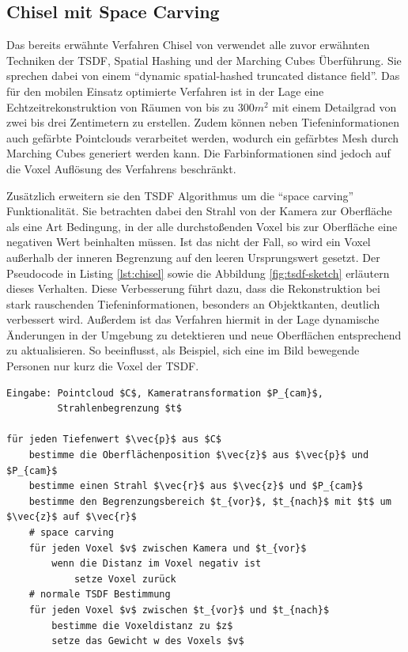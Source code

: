 \subsection{Chisel mit Space Carving} \label{sec:chisel}

Das bereits erwähnte Verfahren Chisel von \citet{Klingensmith_2015_7924} verwendet alle zuvor erwähnten Techniken der TSDF, Spatial Hashing und der Marching Cubes Überführung. Sie sprechen dabei von einem \enquote{dynamic spatial-hashed truncated distance field}. Das für den mobilen Einsatz optimierte Verfahren ist in der Lage eine Echtzeitrekonstruktion von Räumen von bis zu \(300 m^2\) mit einem Detailgrad von zwei bis drei Zentimetern zu erstellen. Zudem können neben Tiefeninformationen auch gefärbte Pointclouds verarbeitet werden, wodurch ein gefärbtes Mesh durch Marching Cubes generiert werden kann. Die Farbinformationen sind jedoch auf die Voxel Auflösung des Verfahrens beschränkt. \citep{Klingensmith_2015_7924}

Zusätzlich erweitern sie den TSDF Algorithmus um die \enquote{space carving} Funktionalität. Sie betrachten dabei den Strahl von der Kamera zur Oberfläche als eine Art Bedingung, in der alle durchstoßenden Voxel bis zur Oberfläche eine negativen Wert beinhalten müssen. Ist das nicht der Fall, so wird ein Voxel außerhalb der inneren Begrenzung auf den leeren Ursprungswert gesetzt. Der Pseudocode in Listing \ref{lst:chisel} sowie die Abbildung \ref{fig:tsdf-sketch} erläutern dieses Verhalten. Diese Verbesserung führt dazu, dass die Rekonstruktion bei stark rauschenden Tiefeninformationen, besonders an Objektkanten, deutlich verbessert wird. Außerdem ist das Verfahren hiermit in der Lage dynamische Änderungen in der Umgebung zu detektieren und neue Oberflächen entsprechend zu aktualisieren. So beeinflusst, als Beispiel, sich eine im Bild bewegende Personen nur kurz die Voxel der TSDF. \citep{Klingensmith_2015_7924}


\begin{lstlisting}[mathescape,caption=Chisel TSDF Algorithmus, label=lst:chisel, float=htbp]
Eingabe: Pointcloud $C$, Kameratransformation $P_{cam}$, 
         Strahlenbegrenzung $t$

für jeden Tiefenwert $\vec{p}$ aus $C$
    bestimme die Oberflächenposition $\vec{z}$ aus $\vec{p}$ und $P_{cam}$
    bestimme einen Strahl $\vec{r}$ aus $\vec{z}$ und $P_{cam}$
    bestimme den Begrenzungsbereich $t_{vor}$, $t_{nach}$ mit $t$ um $\vec{z}$ auf $\vec{r}$
    # space carving
    für jeden Voxel $v$ zwischen Kamera und $t_{vor}$
        wenn die Distanz im Voxel negativ ist
            setze Voxel zurück
    # normale TSDF Bestimmung
    für jeden Voxel $v$ zwischen $t_{vor}$ und $t_{nach}$
        bestimme die Voxeldistanz zu $z$
        setze das Gewicht w des Voxels $v$
\end{lstlisting}

